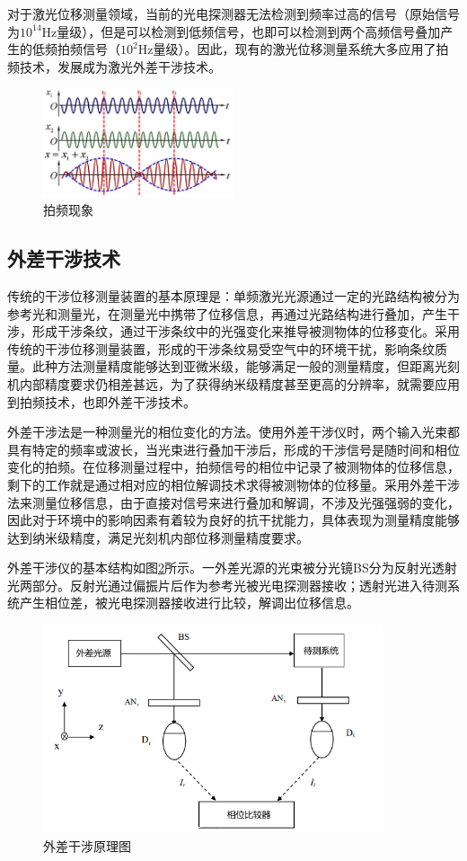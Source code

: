 \documentclass[type=master,oneside]{fduthesis}
\begin{document}
对于激光位移测量领域，当前的光电探测器无法检测到频率过高的信号（原始信号为$10^{14} $Hz量级），但是可以检测到低频信号，也即可以检测到两个高频信号叠加产生的低频拍频信号（$10^{2} $Hz量级）。因此，现有的激光位移测量系统大多应用了拍频技术，发展成为激光外差干涉技术。

\begin{figure}[H]
  \centering
  \includegraphics[width=0.5\textwidth]{2-fig//拍频现象.jpg}
  \caption{拍频现象}
  \label{fig:拍频现象}
\end{figure}

\subsection{外差干涉技术}
传统的干涉位移测量装置的基本原理是：单频激光光源通过一定的光路结构被分为参考光和测量光，在测量光中携带了位移信息，再通过光路结构进行叠加，产生干涉，形成干涉条纹，通过干涉条纹中的光强变化来推导被测物体的位移变化。采用传统的干涉位移测量装置，形成的干涉条纹易受空气中的环境干扰，影响条纹质量。此种方法测量精度能够达到亚微米级，能够满足一般的测量精度，但距离光刻机内部精度要求仍相差甚远，为了获得纳米级精度甚至更高的分辨率，就需要应用到拍频技术，也即外差干涉技术。

外差干涉法是一种测量光的相位变化的方法。使用外差干涉仪时，两个输入光束都具有特定的频率或波长，当光束进行叠加干涉后，形成的干涉信号是随时间和相位变化的拍频。在位移测量过程中，拍频信号的相位中记录了被测物体的位移信息，剩下的工作就是通过相对应的相位解调技术求得被测物体的位移量。采用外差干涉法来测量位移信息，由于直接对信号来进行叠加和解调，不涉及光强强弱的变化，因此对于环境中的影响因素有着较为良好的抗干扰能力，具体表现为测量精度能够达到纳米级精度，满足光刻机内部位移测量精度要求。

外差干涉仪的基本结构如图\ref{fig:外差干涉原理图}所示。一外差光源的光束被分光镜BS分为反射光透射光两部分。反射光通过偏振片后作为参考光被光电探测器接收；透射光进入待测系统产生相位差，被光电探测器接收进行比较，解调出位移信息。
\begin{figure}[H]
  \centering
  \includegraphics[width=10cm]{2-fig/外差干涉原理图.png}
  \caption{外差干涉原理图}
  \label{fig:外差干涉原理图}
\end{figure}
\end{document}
